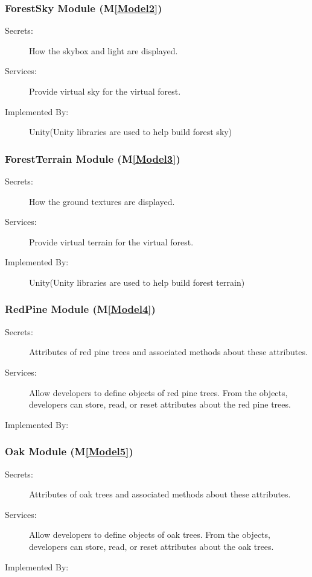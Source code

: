 \documentclass[12pt, titlepage]{article}
\newcommand{\mref}[1]{M\ref{#1}}
\begin{document}
\subsubsection{ForestSky Module (\mref{Model2})}
\begin{description}
\item[Secrets:] How the skybox and light are displayed.
\item[Services:] Provide virtual sky for the virtual forest.
\item[Implemented By:] \progname{} Unity(Unity libraries are used to help build forest sky)
\end{description}

\subsubsection{ForestTerrain Module (\mref{Model3})}
\begin{description}
\item[Secrets:] How the ground textures are displayed.
\item[Services:] Provide virtual terrain for the virtual forest.
\item[Implemented By:] \progname{} Unity(Unity libraries are used to help build forest 
terrain)
\end{description}

\subsubsection{RedPine Module (\mref{Model4})}
\begin{description}
\item[Secrets:] Attributes of red pine trees and associated methods about these attributes.
\item[Services:] Allow developers to define objects of red pine trees. From the objects, developers can store,
read, or reset attributes about the red pine trees.
\item[Implemented By:] \progname{}
\end{description}


\subsubsection{Oak Module (\mref{Model5})}
\begin{description}
\item[Secrets:] Attributes of oak trees and associated methods about these attributes.
\item[Services:] Allow developers to define objects of oak trees. From the objects, developers can store,
read, or reset attributes about the oak trees.
\item[Implemented By:] \progname{}
\end{description}
\end{document}
